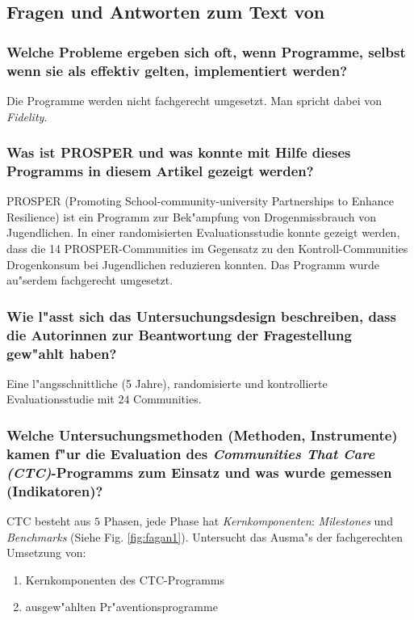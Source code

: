 \subsection{Fragen und Antworten zum Text von \textcite{fagan_translational_2009}}
\subsubsection{Welche Probleme ergeben sich oft, wenn Programme, selbst wenn sie als effektiv gelten, implementiert werden?}
Die Programme werden nicht fachgerecht umgesetzt. Man spricht dabei von \emph{Fidelity}.

\subsubsection{Was ist PROSPER und was konnte mit Hilfe dieses Programms in diesem Artikel gezeigt werden?}
PROSPER (Promoting School-community-university Partnerships to Enhance Resilience) ist ein Programm zur Bek"ampfung von Drogenmissbrauch von Jugendlichen. In einer randomisierten Evaluationsstudie konnte gezeigt werden, dass die 14 PROSPER-Communities im Gegensatz zu den Kontroll-Communities Drogenkonsum bei Jugendlichen reduzieren konnten. Das Programm wurde au"serdem fachgerecht umgesetzt.

\subsubsection{Wie l"asst sich das Untersuchungsdesign beschreiben, dass die Autorinnen zur Beantwortung der Fragestellung gew"ahlt haben?}
Eine l"angsschnittliche (5 Jahre), randomisierte und kontrollierte Evaluationsstudie mit $24$ Communities.

\subsubsection{Welche Untersuchungsmethoden (Methoden, Instrumente) kamen f"ur die Evaluation des \emph{Communities That Care (CTC)}-Programms zum Einsatz und was wurde gemessen (Indikatoren)?}
CTC besteht aus $5$ Phasen, jede Phase hat \emph{Kernkomponenten}: \emph{Milestones} und \emph{Benchmarks} (Siehe Fig. \ref{fig:fagan1}). Untersucht das Ausma"s der fachgerechten Umsetzung von:
\begin{enumerate}
        \item Kernkomponenten des CTC-Programms 
        \item ausgew"ahlten Pr"aventionsprogramme
\end{enumerate}

